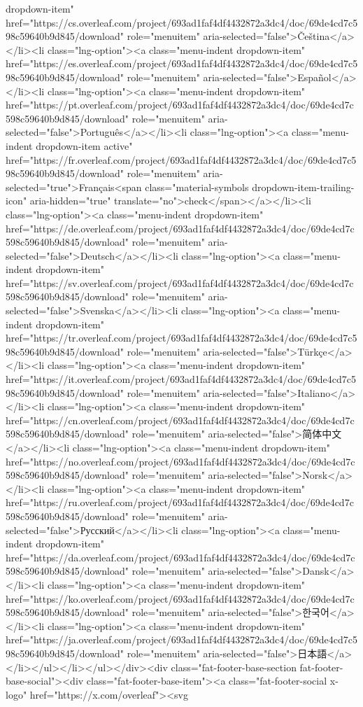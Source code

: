 dropdown-item" href="https://cs.overleaf.com/project/693ad1faf4df4432872a3dc4/doc/69de4cd7c598c59640b9d845/download" role="menuitem" aria-selected="false">Čeština</a></li><li class="lng-option"><a class="menu-indent dropdown-item" href="https://es.overleaf.com/project/693ad1faf4df4432872a3dc4/doc/69de4cd7c598c59640b9d845/download" role="menuitem" aria-selected="false">Español</a></li><li class="lng-option"><a class="menu-indent dropdown-item" href="https://pt.overleaf.com/project/693ad1faf4df4432872a3dc4/doc/69de4cd7c598c59640b9d845/download" role="menuitem" aria-selected="false">Português</a></li><li class="lng-option"><a class="menu-indent dropdown-item active" href="https://fr.overleaf.com/project/693ad1faf4df4432872a3dc4/doc/69de4cd7c598c59640b9d845/download" role="menuitem" aria-selected="true">Français<span class="material-symbols dropdown-item-trailing-icon" aria-hidden="true" translate="no">check</span></a></li><li class="lng-option"><a class="menu-indent dropdown-item" href="https://de.overleaf.com/project/693ad1faf4df4432872a3dc4/doc/69de4cd7c598c59640b9d845/download" role="menuitem" aria-selected="false">Deutsch</a></li><li class="lng-option"><a class="menu-indent dropdown-item" href="https://sv.overleaf.com/project/693ad1faf4df4432872a3dc4/doc/69de4cd7c598c59640b9d845/download" role="menuitem" aria-selected="false">Svenska</a></li><li class="lng-option"><a class="menu-indent dropdown-item" href="https://tr.overleaf.com/project/693ad1faf4df4432872a3dc4/doc/69de4cd7c598c59640b9d845/download" role="menuitem" aria-selected="false">Türkçe</a></li><li class="lng-option"><a class="menu-indent dropdown-item" href="https://it.overleaf.com/project/693ad1faf4df4432872a3dc4/doc/69de4cd7c598c59640b9d845/download" role="menuitem" aria-selected="false">Italiano</a></li><li class="lng-option"><a class="menu-indent dropdown-item" href="https://cn.overleaf.com/project/693ad1faf4df4432872a3dc4/doc/69de4cd7c598c59640b9d845/download" role="menuitem" aria-selected="false">简体中文</a></li><li class="lng-option"><a class="menu-indent dropdown-item" href="https://no.overleaf.com/project/693ad1faf4df4432872a3dc4/doc/69de4cd7c598c59640b9d845/download" role="menuitem" aria-selected="false">Norsk</a></li><li class="lng-option"><a class="menu-indent dropdown-item" href="https://ru.overleaf.com/project/693ad1faf4df4432872a3dc4/doc/69de4cd7c598c59640b9d845/download" role="menuitem" aria-selected="false">Русский</a></li><li class="lng-option"><a class="menu-indent dropdown-item" href="https://da.overleaf.com/project/693ad1faf4df4432872a3dc4/doc/69de4cd7c598c59640b9d845/download" role="menuitem" aria-selected="false">Dansk</a></li><li class="lng-option"><a class="menu-indent dropdown-item" href="https://ko.overleaf.com/project/693ad1faf4df4432872a3dc4/doc/69de4cd7c598c59640b9d845/download" role="menuitem" aria-selected="false">한국어</a></li><li class="lng-option"><a class="menu-indent dropdown-item" href="https://ja.overleaf.com/project/693ad1faf4df4432872a3dc4/doc/69de4cd7c598c59640b9d845/download" role="menuitem" aria-selected="false">日本語</a></li></ul></li></ul></div><div class="fat-footer-base-section fat-footer-base-social"><div class="fat-footer-base-item"><a class="fat-footer-social x-logo" href="https://x.com/overleaf"><svg 